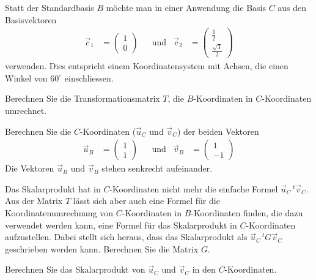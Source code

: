Statt der Standardbasis $B$ möchte man in einer Anwendung die Basis
$C$ aus den Basisvektoren
\[
\begin{aligned}
\vec c_1
&=
\begin{pmatrix}1\\0\end{pmatrix}
&
&\text{und}
&
\vec c_2
&=
\begin{pmatrix}\frac12\\\frac{\sqrt{3}}2\end{pmatrix}
\end{aligned}
\]
verwenden.
Dies entspricht einem Koordinatensystem mit Achsen, die einen Winkel
von $60^\circ$ ein\-schliessen.
\begin{teilaufgaben}
\item
Berechnen Sie die Transformationsmatrix $T$, die $B$-Koordinaten
in $C$-Koordinaten umrechnet.
\item
Berechnen Sie die $C$-Koordinaten ($\vec u_C$ und $\vec v_C$) der beiden Vektoren
\[
\begin{aligned}
\vec u_B&=\begin{pmatrix}1\\1\end{pmatrix}
&&\text{und}&
\vec v_B&=\begin{pmatrix}1\\-1\end{pmatrix}
\end{aligned}
\]
Die Vektoren $\vec u_B$ und $\vec v_B$ stehen senkrecht aufeinander.
\item
Das Skalarprodukt hat in $C$-Koordinaten nicht mehr die einfache
Formel $\vec u_C\,\!\!^t \vec v_C$.
Aus der Matrix $T$ lässt sich aber auch eine Formel für die
Koordinatenumrechnung von $C$-Koordinaten in $B$-Koordinaten finden,
die dazu verwendet werden kann, eine Formel für das Skalarprodukt in
$C$-Koordinaten aufzustellen.
Dabei stellt sich heraus, dass das Skalarprodukt
als $\vec u_C\,\!\!^tG\vec v_C$ geschrieben werden kann.
Berechnen Sie die Matrix $G$.
\item 
Berechnen Sie das Skalarprodukt von $\vec u_C$ und $\vec v_C$ in den $C$-Koordinaten.
\end{teilaufgaben}


